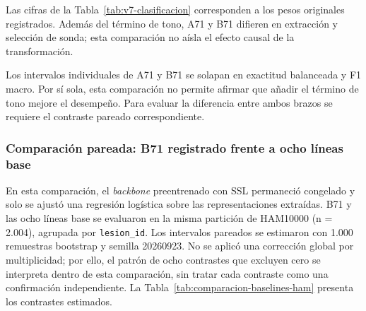 Las cifras de la Tabla~\ref{tab:v7-clasificacion} corresponden a los pesos originales registrados. Además del término de tono, A71 y B71 difieren en extracción y selección de sonda; esta comparación no aísla el efecto causal de la transformación.

Los intervalos individuales de A71 y B71 se solapan en exactitud balanceada y F1 macro. Por sí sola, esta comparación no permite afirmar que añadir el término de tono mejore el desempeño. Para evaluar la diferencia entre ambos brazos se requiere el contraste pareado correspondiente.

\FloatBarrier


\subsubsection{Comparación pareada: B71 registrado frente a ocho líneas base}

En esta comparación, el \textit{backbone} preentrenado con SSL permaneció congelado y solo se ajustó una regresión logística sobre las representaciones extraídas. B71 y las ocho líneas base se evaluaron en la misma partición de HAM10000 (n = 2.004), agrupada por \texttt{lesion\_id}. Los intervalos pareados se estimaron con 1.000 remuestras bootstrap y semilla 20260923. No se aplicó una corrección global por multiplicidad; por ello, el patrón de ocho contrastes que excluyen cero se interpreta dentro de esta comparación, sin tratar cada contraste como una confirmación independiente. La Tabla~\ref{tab:comparacion-baselines-ham} presenta los contrastes estimados.

